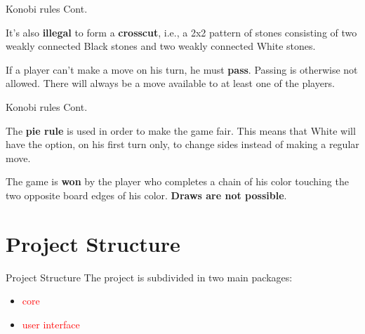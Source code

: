 \documentclass{beamer}
\begin{document}
  \begin{frame}{Konobi rules Cont.}

    It's also \textbf{illegal} to form a \textbf{crosscut}, i.e., a 2x2 pattern of stones consisting of two weakly connected Black stones and two weakly connected White stones.

    \vspace{1em}

    \begin{centering}


    \end{centering}\pause

    \vspace{1em}

    If a player can't make a move on his turn, he must \textbf{pass}. Passing is otherwise not allowed. There will always be a move available to at least one of the players.

  \end{frame}


  \begin{frame}{Konobi rules Cont.}

    The \textbf{pie rule} is used in order to make the game fair. This means that White will have the option, on his first turn only, to change sides instead of making a regular move.\pause

    \vspace{3em}

    The game is \textbf{won} by the player who completes a chain of his color touching the two opposite board edges of his color. \textbf{Draws are not possible}.

  \end{frame}

\section{Project Structure}

  \begin{frame}{Project Structure} 
  The project is subdivided in two main packages:
    \begin{itemize}
        \item \textcolor{red}{core}
        \item \textcolor{red}{user interface}
     \end{itemize}

 \vspace{4em}

	
    \end{frame}
\end{document}
